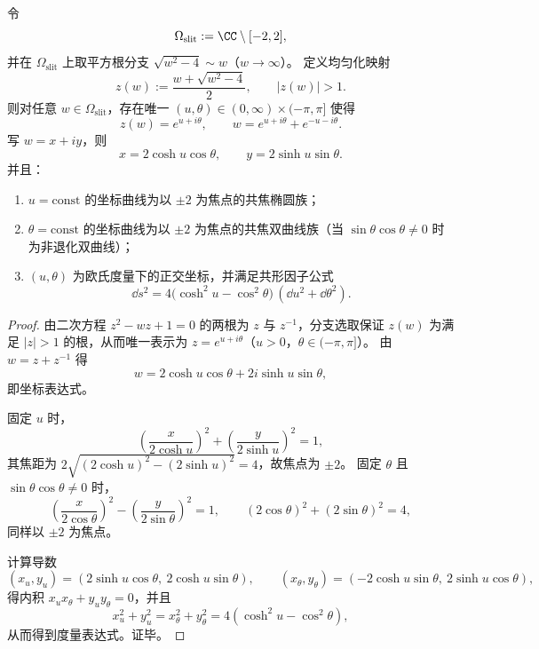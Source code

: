 \begin{theorem}\label{thm:conclusion-jg-slit-uniformization-orthogonal-coordinates}
令
\[
\Omega_{\mathrm{slit}}:=\CC\setminus[-2,2],
\]
并在 \(\Omega_{\mathrm{slit}}\) 上取平方根分支 \(\sqrt{w^2-4}\sim w\)（\(w\to\infty\)）。
定义均匀化映射
\[
z(w):=\frac{w+\sqrt{w^2-4}}{2},
\qquad |z(w)|>1.
\]
则对任意 \(w\in\Omega_{\mathrm{slit}}\)，存在唯一 \((u,\theta)\in(0,\infty)\times(-\pi,\pi]\) 使得
\[
z(w)=e^{u+i\theta},
\qquad
w=e^{u+i\theta}+e^{-u-i\theta}.
\]
写 \(w=x+iy\)，则
\[
x=2\cosh u\cos\theta,\qquad
y=2\sinh u\sin\theta.
\]
并且：
\begin{enumerate}
\normalfont
  \item \(u=\mathrm{const}\) 的坐标曲线为以 \(\pm2\) 为焦点的共焦椭圆族；
  \item \(\theta=\mathrm{const}\) 的坐标曲线为以 \(\pm2\) 为焦点的共焦双曲线族（当 \(\sin\theta\cos\theta\neq 0\) 时为非退化双曲线）；
  \item \((u,\theta)\) 为欧氏度量下的正交坐标，并满足共形因子公式
  \[
  \dd s^2
  =4\bigl(\cosh^2u-\cos^2\theta\bigr)\,(\dd u^2+\dd\theta^2).
  \]
\end{enumerate}
\end{theorem}
\begin{proof}
由二次方程 \(z^2-wz+1=0\) 的两根为 \(z\) 与 \(z^{-1}\)，分支选取保证 \(z(w)\) 为满足 \(|z|>1\) 的根，从而唯一表示为 \(z=e^{u+i\theta}\)（\(u>0\)，\(\theta\in(-\pi,\pi]\)）。
由 \(w=z+z^{-1}\) 得
\[
w=2\cosh u\cos\theta+2i\sinh u\sin\theta,
\]
即坐标表达式。
\par
固定 \(u\) 时，
\[
\left(\frac{x}{2\cosh u}\right)^2+\left(\frac{y}{2\sinh u}\right)^2=1,
\]
其焦距为 \(2\sqrt{(2\cosh u)^2-(2\sinh u)^2}=4\)，故焦点为 \(\pm2\)。
固定 \(\theta\) 且 \(\sin\theta\cos\theta\neq 0\) 时，
\[
\left(\frac{x}{2\cos\theta}\right)^2-\left(\frac{y}{2\sin\theta}\right)^2=1,
\qquad
(2\cos\theta)^2+(2\sin\theta)^2=4,
\]
同样以 \(\pm2\) 为焦点。
\par
计算导数
\[
(x_u,y_u)=(2\sinh u\cos\theta,\ 2\cosh u\sin\theta),\qquad
(x_\theta,y_\theta)=(-2\cosh u\sin\theta,\ 2\sinh u\cos\theta),
\]
得内积 \(x_u x_\theta+y_u y_\theta=0\)，并且
\[
x_u^2+y_u^2=x_\theta^2+y_\theta^2=4(\cosh^2u-\cos^2\theta),
\]
从而得到度量表达式。证毕。
\end{proof}

